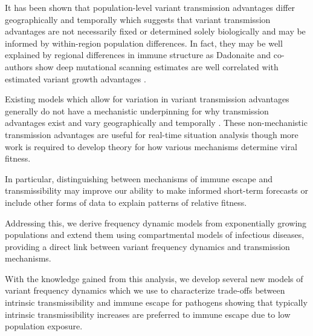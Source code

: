 \documentclass[12pt,oneside,letterpaper]{article}
\def\tbc#1{\textcolor{purple}{[#1]}}
\begin{document}
It has been shown that population-level variant transmission advantages differ geographically and temporally which suggests that variant transmission advantages are not necessarily fixed or determined solely biologically and may be informed by within-region population differences.  \cite{figgins2022sars, vanDorp2022}
In fact, they may be well explained by regional differences in immune structure as Dadonaite and co-authors show deep mutational scanning estimates are well correlated with estimated variant growth advantages \cite{Dadonaite2023}.

Existing models which allow for variation in variant transmission advantages generally do not have a mechanistic underpinning for why transmission advantages exist and vary geographically and temporally \cite{figgins2022sars, susswein2023leveraging}.
These non-mechanistic transmission advantages are useful for real-time situation analysis though more work is required to develop theory for how various mechanisms determine viral fitness.

In particular, distinguishing between mechanisms of immune escape and transmissibility may improve our ability to make informed short-term forecasts or include other forms of data to explain patterns of relative fitness. 

Addressing this, we derive frequency dynamic models from exponentially growing populations and extend them using compartmental models of infectious diseases, providing a direct link between variant frequency dynamics and transmission mechanisms.



With the knowledge gained from this analysis, we develop several new models of variant frequency dynamics which we use to characterize trade-offs between intrinsic transmissibility and immune escape for pathogens showing that typically intrinsic transmissibility increases are preferred to immune escape due to low population exposure.
\end{document}
